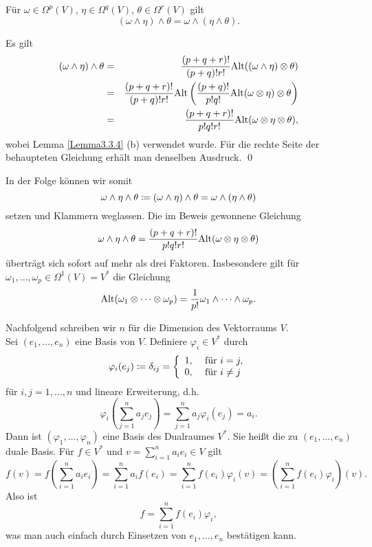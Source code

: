 \documentclass[a4paper,twoside,DIV15,BCOR12mm]{scrbook}
\begin{document}
\bigskip

\begin{satz}\label{Satz3.3.5} {Für $\omega \in \Omega^{p}(V)$, 
$\eta \in \Omega^{q}(V)$, $\theta \in \Omega^{r}(V)$ gilt}
\[ (\omega \wedge \eta) \wedge \theta = \omega \wedge (\eta \wedge 
\theta). \]
\end{satz}

\bigskip

 Es gilt
\begin{eqnarray*}
(\omega \wedge \eta) \wedge \theta & = & \frac{(p+q+r)!}{(p+q)!r!} 
{\rm Alt}((\omega \wedge \eta) \otimes \theta) \\
& = & \frac{(p+q+r)!}{(p+q)!r!} {\rm Alt}\left(\frac{(p+q)!}{p!q!} 
{\rm Alt}(\omega \otimes \eta) \otimes \theta\right) \\
& = & \frac{(p+q+r)!}{p!q!r!} {\rm Alt}(\omega \otimes \eta \otimes 
\theta),
\end{eqnarray*}
wobei Lemma \ref{Lemma3.3.4} (b) verwendet wurde. Für die rechte Seite der 
behaupteten Gleichung erhält man denselben Ausdruck. \qed\\

\bigskip

\noindent
In der Folge können wir somit
\[ \omega \wedge \eta \wedge \theta \da  (\omega \wedge \eta) \wedge 
\theta = \omega \wedge(\eta \wedge \theta) \]
setzen und Klammern weglassen. Die im Beweis gewonnene Gleichung
\[ \omega \wedge \eta \wedge \theta = \frac{(p+q+r)!}{p!q!r!} {\rm 
Alt}(\omega \otimes \eta \otimes \theta) \]
überträgt sich sofort auf mehr als drei Faktoren. Insbesondere gilt 
für $\omega_{1},\dots,\omega_{p} \in \Omega^{1}(V) = V^{*}$ die 
Gleichung
\[ {\rm Alt}(\omega_{1} \otimes \dots \otimes \omega_{p}) = 
\frac{1}{p!} \omega_{1} \wedge \dots \wedge \omega_{p}. \]

\bigskip

 Nachfolgend schreiben wir $n$ für die 
Dimension des Vektorraums $V$.\\

 Sei $(e_{1},\dots,e_{n})$ eine Basis 
von $V$. Definiere $\varphi_{i} \in V^{*}$ durch
\[ \varphi_{i}(e_{j}) \da  \delta_{ij} = \left\{ \begin{array}{ll} 1, & 
\mbox{ für } i = j, \\
0, & \mbox{ für } i \not= j \end{array} \right. \]
für $i, j = 1,\dots,n$ und lineare Erweiterung, d.h.
\[ \varphi_{i}\left(\sum_{j=1}^{n}a_{j}e_{j}\right) = \sum_{j=1}^{n} 
a_{j} \varphi_{i}(e_{j}) = a_{i}. \]
Dann ist $(\varphi_{1},\dots,\varphi_{n})$ eine Basis des Dualraumes 
$V^{*}$. Sie heißt die zu $(e_{1},\dots,e_{n})$ duale Basis. Für $f 
\in V^{*}$ und $v = \sum_{i=1}^{n} a_{i}e_{i} \in V$ gilt
\[
f(v)  =  f\left(\sum_{i=1}^{n}a_{i}e_{i}\right) = \sum_{i=1}^{n} 
a_{i}f(e_{i}) = \sum_{i=1}^{n}f(e_{i}) \varphi_{i}(v) 
 =  \left(\sum_{i=1}^{n} f(e_{i}) \varphi_{i}\right) (v).
\]
Also ist
\[ f = \sum_{i=1}^{n} f(e_{i})\varphi_{i},\]
was man auch einfach durch Einsetzen von $e_1,\ldots,e_n$ bestätigen kann.\\
 
\end{document}
